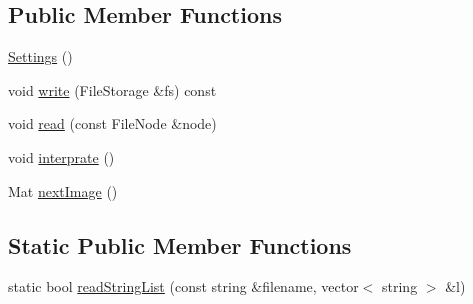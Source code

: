 \subsection*{Public Member Functions}
\begin{DoxyCompactItemize}
\item 
\hyperlink{classSettings_ab7169a6eefce79566dd07db3b1e5e967}{Settings} ()
\item 
void \hyperlink{classSettings_ae320e2f94798ba2de400f73a8110d412}{write} (FileStorage \&fs) const 
\item 
void \hyperlink{classSettings_a2d7841f8441095032e0f3b7d20adfd3f}{read} (const FileNode \&node)
\item 
void \hyperlink{classSettings_ac01c17bf3536e296f1076e50cdcb00cd}{interprate} ()
\item 
Mat \hyperlink{classSettings_a7701462e928f2425b342440fba9973e5}{nextImage} ()
\end{DoxyCompactItemize}
\subsection*{Static Public Member Functions}
\begin{DoxyCompactItemize}
\item 
static bool \hyperlink{classSettings_ae57696cead99c4f0c528e33793866457}{readStringList} (const string \&filename, vector$<$ string $>$ \&l)
\end{DoxyCompactItemize}
